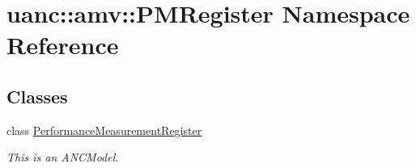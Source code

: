 \hypertarget{namespaceuanc_1_1amv_1_1_p_m_register}{}\section{uanc\+:\+:amv\+:\+:P\+M\+Register Namespace Reference}
\label{namespaceuanc_1_1amv_1_1_p_m_register}
\subsection*{Classes}
\begin{DoxyCompactItemize}
\item 
class \hyperlink{classuanc_1_1amv_1_1_p_m_register_1_1_performance_measurement_register}{Performance\+Measurement\+Register}
\begin{DoxyCompactList}\small\item\em This is an A\+N\+C\+Model. \end{DoxyCompactList}\end{DoxyCompactItemize}
